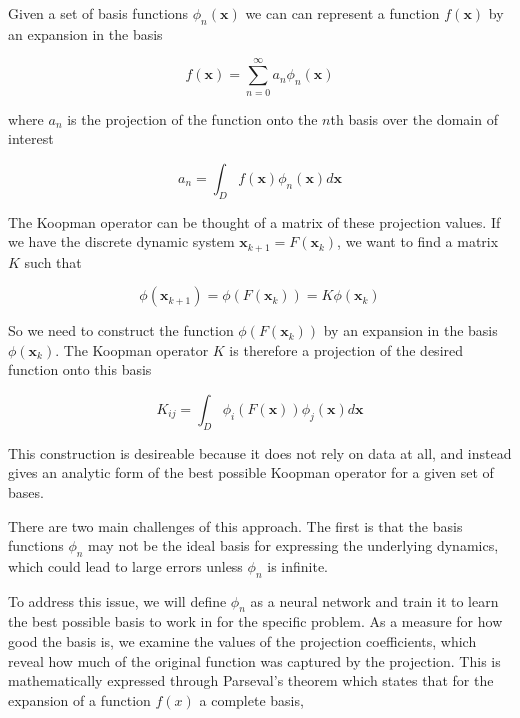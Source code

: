 \documentclass[12pt, letterpaper]{article}
\begin{document}
Given a set of basis functions $\phi_n(\mathbf{x})$ we can can represent a function $f(\mathbf{x})$ by an expansion in the basis

\begin{equation}
    f(\mathbf{x}) = \overset{\infty}{\underset{n=0}{\sum}} a_n \phi_n(\mathbf{x})
\end{equation}

where $a_n$ is the projection of the function onto the $n$th basis over the domain of interest

\begin{equation}
    a_n = \int_D f(\mathbf{x}) \phi_n(\mathbf{x})  d \mathbf{x}
\end{equation}

The Koopman operator can be thought of a matrix of these projection values.  If we have the discrete dynamic system $\mathbf{x}_{k+1} = F(\mathbf{x}_k)$, we want to find a matrix $K$ such that 

\begin{equation}
    \phi(\mathbf{x}_{k+1}) = \phi(F(\mathbf{x}_k)) = K \phi(\mathbf{x}_k)
\end{equation}

So we need to construct the function $\phi(F(\mathbf{x}_k))$ by an expansion in the basis $\phi(\mathbf{x}_k)$.  The Koopman operator $K$ is therefore a projection of the desired function onto this basis

\begin{equation}
    \label{eq:koopman_projection}
    K_{ij} = \int_D \phi_i(F(\mathbf{x})) \phi_j(\mathbf{x})  d \mathbf{x}
\end{equation}

This construction is desireable because it does not rely on data at all, and instead gives an analytic form of the best possible Koopman operator for a given set of bases.  

There are two main challenges of this approach.  The first is that the basis functions $\phi_n$ may not be the ideal basis for expressing the underlying dynamics, which could lead to large errors unless $\phi_n$ is infinite.  

To address this issue, we will define $\phi_n$ as a neural network and train it to learn the best possible basis to work in for the specific problem.  As a measure for how good the basis is, we examine the values of the projection coefficients, which reveal how much of the original function was captured by the projection.  This is mathematically expressed through Parseval's theorem which states that for the expansion of a function $f(x)$ a complete basis,
\end{document}
